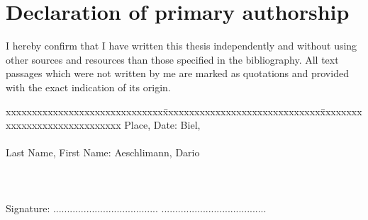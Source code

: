 \chapter*{Declaration of primary authorship}
\label{chap:declaration_authorship}

\vspace*{10mm} 

I hereby confirm that I have written this thesis independently and without using other sources and resources than those specified in the bibliography. All text passages which were not written by me are marked as quotations and provided with the exact indication of its origin. 

\vspace{15mm}

\begin{tabbing}
xxxxxxxxxxxxxxxxxxxxxxxxxxxxxx\=xxxxxxxxxxxxxxxxxxxxxxxxxxxxxx\=xxxxxxxxxxxxxxxxxxxxxxxxxxxxxx\kill
Place, Date:		\> Biel, \versiondate \\ \\ 
Last Name, First Name:	\> Aeschlimann, Dario 	\>  \\ \\ \\ \\ 
Signature:	\> ......................................\> ...................................... \\
\end{tabbing}
